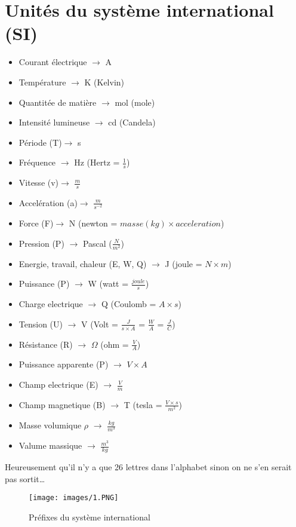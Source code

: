 \documentclass[a4paper]{article}
\begin{document}
\section{Unités du système international (SI)}
\begin{itemize}
    \item Courant électrique $\rightarrow$ A
    \item Température $\rightarrow$ K (Kelvin)
    \item Quantitée de matière $\rightarrow$ mol (mole)
    \item Intensité lumineuse $\rightarrow$ cd (Candela)
    \item Période (T)$\rightarrow$ s
    \item Fréquence $\rightarrow$ Hz (Hertz = $\frac{1}{s}$)
    \item Vitesse (v)$\rightarrow$ $\frac{m}{s}$
    \item Accelération (a)$\rightarrow$ $\frac{m}{s^{-2}}$
    \item Force (F)$\rightarrow$ N (newton = $masse (kg) \times acceleration $)
    \item Pression (P) $\rightarrow$ Pascal ($\frac{N}{m^2}$)
    \item Energie, travail, chaleur (E, W, Q) $\rightarrow$ J (joule = $N \times m$)
    \item Puissance (P) $\rightarrow$ W (watt = $\frac{joule}{s}$)
    \item Charge electrique $\rightarrow$ Q (Coulomb = $A \times s$)
    \item Tension (U) $\rightarrow$ V (Volt = $\frac{J}{s \times A}$ = $\frac{W}{A}$ = $\frac{J}{C}$)
    \item Résistance (R) $\rightarrow$ $\Omega$ (ohm = $\frac{V}{A}$)
    \item Puissance apparente (P) $\rightarrow$ $V \times A$
    \item Champ electrique (E) $\rightarrow$ $\frac{V}{m}$
    \item Champ magnetique (B) $\rightarrow$ T (tesla = $\frac{V \times s}{m^2}$)
    \item Masse volumique $\rho$ $\rightarrow$ $\frac{kg}{m^3}$
    \item Valume massique $\rightarrow$ $\frac{m^3}{kg}$
\end{itemize}
\scriptsize Heureusement qu'il n'y a que 26 lettres dans l'alphabet sinon on ne s'en serait pas sortit\dots
\normalsize

\begin{figure}[H]
    \centering
    \texttt{[image: images/1.PNG]}
    \caption{Préfixes du système international}
\end{figure}
\end{document}
